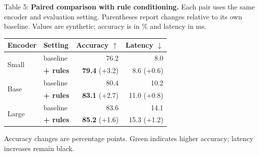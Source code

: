 \documentclass[10pt]{article}
\newcommand{\captext}[3]{\noindent Table #1: \textbf{#2} #3\par\vspace{5pt}}
\begin{document}
\captext{5}{Paired comparison with rule conditioning.}{Each pair uses the same encoder and evaluation setting. Parentheses report changes relative to its own baseline. Values are synthetic; accuracy is in \% and latency in ms.}
\begin{center}\begin{tabular}{@{}llrr@{}}\toprule
Encoder & Setting & Accuracy $\uparrow$ & Latency $\downarrow$\\\midrule
\multirow{2}{*}{Small} & baseline & 76.2 & 8.0 \\
 & \textbf{+ rules} & \textbf{79.4} {\small\textcolor{gain}{(+3.2)}} & 8.6 {\small (+0.6)} \\
\midrule
\multirow{2}{*}{Base} & baseline & 80.4 & 10.2 \\
 & \textbf{+ rules} & \textbf{83.1} {\small\textcolor{gain}{(+2.7)}} & 11.0 {\small (+0.8)} \\
\midrule
\multirow{2}{*}{Large} & baseline & 83.6 & 14.1 \\
 & \textbf{+ rules} & \textbf{85.2} {\small\textcolor{gain}{(+1.6)}} & 15.3 {\small (+1.2)} \\
\bottomrule\end{tabular}\end{center}
{\footnotesize Accuracy changes are percentage points. Green indicates higher accuracy; latency increases remain black.}
\end{document}
